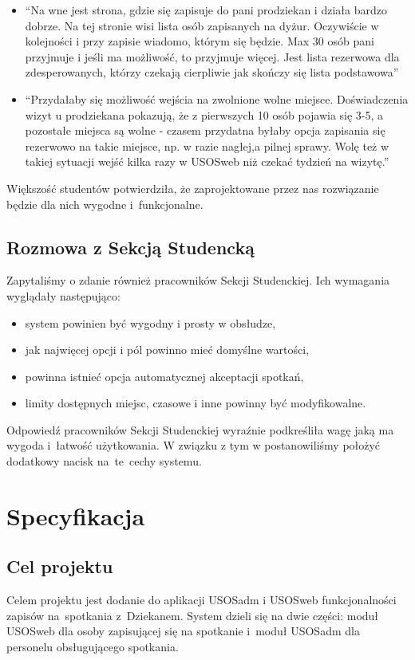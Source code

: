 \documentclass[licencjacka]{pracamgr}
\begin{document}
\begin{itemize}
\begin{itemize}
\item \enquote{Na wne jest strona, gdzie się zapisuje do pani prodziekan i działa bardzo dobrze. Na tej stronie wisi lista osób zapisanych na dyżur. Oczywiście w kolejności i przy zapisie wiadomo, którym się będzie. Max 30 osób pani przyjmuje i jeśli ma możliwość, to przyjmuje więcej. Jest lista rezerwowa dla zdesperowanych, którzy czekają cierpliwie jak skończy się lista podstawowa}
\item \enquote{Przydałaby się możliwość wejścia na zwolnione wolne miejsce. Doświadczenia wizyt u prodziekana pokazują, że z pierwszych 10 osób pojawia się 3-5, a pozostałe miejsca są wolne - czasem przydatna byłaby opcja zapisania się rezerwowo na takie miejsce, np. w razie nagłej,a pilnej sprawy.  Wolę też w takiej sytuacji wejść kilka razy w USOSweb niż czekać tydzień na wizytę.}
\end{itemize}

\end{itemize}
Większość studentów potwierdziła, że zaprojektowane przez nas rozwiązanie będzie dla nich wygodne i~funkcjonalne.
 
\section{Rozmowa z Sekcją Studencką}
Zapytaliśmy o zdanie również pracowników Sekcji Studenckiej. Ich wymagania wyglądały następująco:
\begin{itemize}
\setlength\itemsep{0,05em}
    \item system powinien być wygodny i prosty w obsłudze,
    \item jak najwięcej opcji i pól powinno mieć domyślne wartości,
    \item powinna istnieć opcja automatycznej akceptacji spotkań,
    \item limity dostępnych miejsc, czasowe i inne powinny być modyfikowalne.
\end{itemize}
Odpowiedź pracowników Sekcji Studenckiej wyraźnie podkreśliła wagę jaką ma wygoda i~łatwość użytkowania. W związku z tym w postanowiliśmy położyć dodatkowy nacisk na~te~cechy systemu.


\chapter{Specyfikacja} \label{chap:specyfikacja}

\section{Cel projektu}
Celem projektu jest dodanie do aplikacji USOSadm i USOSweb funkcjonalności zapisów na~spotkania z~Dziekanem. System dzieli się na dwie części: moduł USOSweb dla osoby zapisującej się na spotkanie i~moduł USOSadm dla personelu obsługującego spotkania.
\end{document}
